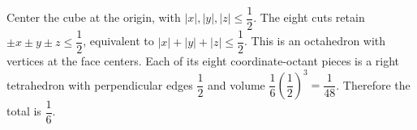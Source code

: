 Center the cube at the origin, with $|x|,|y|,|z|\le\dfrac{1}{2}$. The eight cuts retain $\pm x\pm y\pm z\le\dfrac{1}{2}$, equivalent to $|x|+|y|+|z|\le\dfrac{1}{2}$. This is an octahedron with vertices at the face centers. Each of its eight coordinate-octant pieces is a right tetrahedron with perpendicular edges $\dfrac{1}{2}$ and volume $\dfrac{1}{6}(\dfrac{1}{2})^3=\dfrac{1}{48}$. Therefore the total is $\boxed{\dfrac{1}{6}}$.
